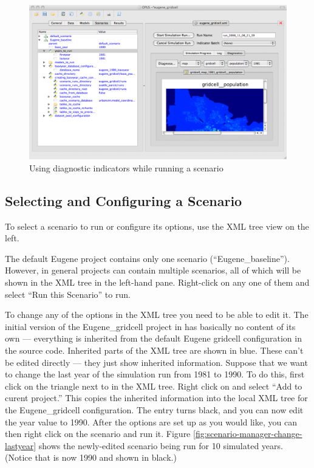 \begin{figure}[htp]
\begin{center}
\includegraphics[scale=0.4]{part-gui/images/scenario-manager-diagnostic-map.png}
\end{center}
\caption{Using diagnostic indicators while running a scenario}
\label{fig:scenario-manager-diagnostic-map}
\end{figure}

\subsection{Selecting and Configuring a Scenario}
\label{sec:configuring-scenario}

To select a scenario to run or configure its options, use the XML tree view
on the left.

The default Eugene project contains only one scenario
(``Eugene\_baseline'').  However, in general projects can contain multiple
scenarios, all of which will be shown in the XML tree in the left-hand
pane.  Right-click on any one of them and select ``Run this Scenario'' to
run.

To change any of the options in the XML tree you need to be able to edit
it.  The initial version of the Eugene\_gridcell project in
 has basically no
content of its own --- everything is inherited from the default Eugene
gridcell configuration in the source code.  Inherited parts of the XML tree
are shown in blue.  These can't be edited directly --- they just show
inherited information.  Suppose that we want to change the last year of the
simulation run from 1981 to 1990.  To do this, first click on the triangle
next to  in the XML tree.  Right click on
 and select ``Add to curent project.''  This copies the
inherited information into the local XML tree for the Eugene\_gridcell
configuration.  The  entry turns black, and you can now edit
the year value to 1990.  After the options are set up as you would like,
you can then right click on the scenario and run it.  Figure
\ref{fig:scenario-manager-change-lastyear} shows the newly-edited scenario
being run for 10 simulated years.  (Notice that  is now 1990
and shown in black.)

